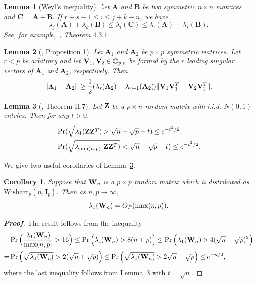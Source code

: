 \documentclass[review]{elsarticle}
\newcommand{\BA}{\mathbf{A}}    \newcommand{\BB}{\mathbf{B}}    \newcommand{\BC}{\mathbf{C}}    \newcommand{\BD}{\mathbf{D}}    \newcommand{\BE}{\mathbf{E}}    \newcommand{\BF}{\mathbf{F}}    \newcommand{\BG}{\mathbf{G}}    \newcommand{\BH}{\mathbf{H}}    \newcommand{\BI}{\mathbf{I}}    \newcommand{\BJ}{\mathbf{J}}    \newcommand{\BK}{\mathbf{K}}    \newcommand{\BL}{\mathbf{L}}
\theoremstyle{plain}
\newtheorem{corollary}{\quad\quad Corollary}
\newtheorem{lemma}{\quad\quad Lemma}
\theoremstyle{definition}
\theoremstyle{remark}
\begin{document}
\begin{appendices}
\begin{lemma}[Weyl's inequality]
Let $\BA$ and $\BB$ be two symmetric $n\times n$ matrices and $\BC=\BA+\BB$. If $r+s-1 \leq  i\leq j+k-n$, we have
\begin{equation*}
\lambda_j(\BA)+\lambda_k(\BB)\leq \lambda_i(\BC) \leq \lambda_r(\BA)+\lambda_s(\BB).
\end{equation*}
    See, for example,~\cite{Horn1985Matrix}, Theorem $4.3.1$.
\end{lemma}

\begin{lemma}[\cite{Cai2015Optimal}, Proposition 1]\label{pert}
    Let $\BA_1$ and $\BA_2$ be $p\times p$ symmetric matrices. Let $r<p$ be arbitrary and let $\mathbf{V}_1, \mathbf{V}_2\in \mathbb{O}_{p,r}$ be formed by the $r$ leading singular vectors of $\BA_1$ and $\BA_2$, respectively.
    Then
    $$
    \|\BA_1-\BA_2\|\geq \frac{1}{2}(\lambda_r(\BA_2)-\lambda_{r+1}(\BA_2))\|\BV_1 \BV_1^T- \BV_2 \BV_2^T\|.
    $$
\end{lemma}


\begin{lemma}[\cite{DAVIDSON2001317}, Theorem II.7]\label{DSbound}
    Let $\mathbf{Z}$ be a $p\times n$ random matrix with i.i.d. $N(0,1)$ entries.
    Then for any $t>0$,
    \begin{align*}
        &\Pr(\sqrt{\lambda_1(\mathbf{Z} \mathbf{Z}^T )}>\sqrt{n}+\sqrt{p}+t)\leq e^{-t^2/2},
        \\
        &\Pr(\sqrt{\lambda_{\min(n,p)}(\mathbf{Z} \mathbf{Z}^T )}<\sqrt{n}-\sqrt{p}-t)\leq e^{-t^2/2}.
    \end{align*}
\end{lemma}
    We give two useful corollaries of Lemma~\ref{DSbound}.
\begin{corollary}\label{maxEigen}
    Suppose that $\mathbf{W}_n$ is a $p \times p$ random matrix which is distributed as $\mathrm{Wishart}_p(n,\BI_{p})$. Then as $n,p\to \infty$,
    $$
        \lambda_1(\mathbf{W}_n)=O_P(\max(n,p)).
    $$
\end{corollary}
\begin{proof}[\textbf{Proof}]
    The result follows from the inequality
    $$
    \begin{aligned}
        &\Pr\Big(\frac{\lambda_1(\mathbf{W}_n)}{\max(n,p)}>16\Big)
        \leq
        \Pr\Big(\lambda_1(\mathbf{W}_n)>8(n+p)\Big)
        \leq
        \Pr\Big(\lambda_1(\mathbf{W}_n)>4(\sqrt{n}+\sqrt{p})^2\Big)\\
        =
        &\Pr\Big(\sqrt{\lambda_1(\mathbf{W}_n)}>2(\sqrt{n}+\sqrt{p})\Big)
        \leq
        \Pr\Big(\sqrt{\lambda_1(\mathbf{W}_n)}>2\sqrt{n}+\sqrt{p}\Big)\leq e^{-n/2},
    \end{aligned}
    $$
    where the last inequality follows from Lemma~\ref{DSbound} with $t=\sqrt{n}$.
\end{proof}


\end{appendices}
\end{document}

